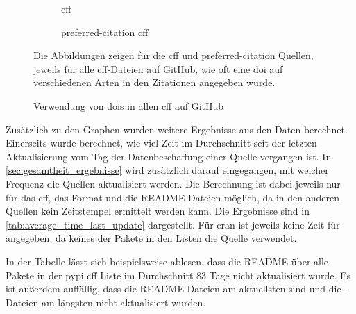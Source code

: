 \begin{figure}
    \begin{subfigure}{.5\textwidth}
        \centering
        
        \caption{\gls{cff}}
        \label{fig:full_cff_doi}
    \end{subfigure}%
    \begin{subfigure}{.5\textwidth}
        \centering
        
        \caption{\glqq preferred-citation\grqq{} \gls{cff}}
        \label{fig:full_preferred_citation_doi}
    \end{subfigure}
    \caption{Verwendung von \gls{doi}s in allen \gls{cff} auf GitHub}
    \label{fig:full_doi}
    \small
    Die Abbildungen zeigen für die \gls{cff} und \glqq preferred-citation\grqq{} Quellen, jeweils für alle \gls{cff}-Dateien auf GitHub, wie oft eine \gls{doi} auf verschiedenen Arten in den Zitationen angegeben wurde.
\end{figure}

Zusätzlich zu den Graphen wurden weitere Ergebnisse aus den Daten berechnet.
Einerseits wurde berechnet, wie viel Zeit im Durchschnitt seit der letzten Aktualisierung vom Tag der Datenbeschaffung einer Quelle vergangen ist.
In \autoref{sec:gesamtheit_ergebnisse} wird zusätzlich darauf eingegangen, mit welcher Frequenz die Quellen aktualisiert werden.
Die Berechnung ist dabei jeweils nur für das \gls{cff}, das  Format und die README-Dateien möglich, da in den anderen Quellen kein Zeitstempel ermittelt werden kann.
Die Ergebnisse sind in \autoref{tab:average_time_last_update} dargestellt.
Für \gls{cran} ist jeweils keine Zeit für  angegeben, da keines der Pakete in den Listen die Quelle verwendet.

In der Tabelle lässt sich beispielsweise ablesen, dass die README über alle Pakete in der \gls{pypi} \gls{cff} Liste im Durchschnitt 83 Tage nicht aktualisiert wurde.
Es ist außerdem auffällig, dass die README-Dateien am aktuellsten sind und die -Dateien am längsten nicht aktualisiert wurden.

